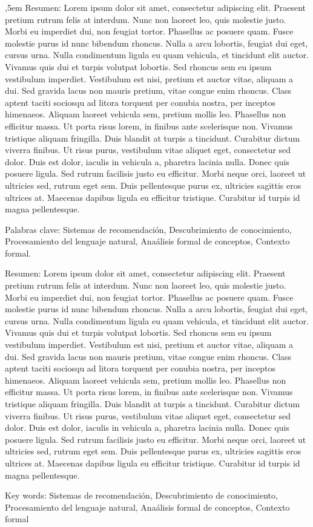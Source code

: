 \setcounter{page}{5}
{
,5em
Resumen: Lorem ipsum dolor sit amet, consectetur adipiscing elit. 
Praesent pretium rutrum felis at interdum. Nunc non laoreet leo, 
quis molestie justo. Morbi eu imperdiet dui, non feugiat tortor. 
Phasellus ac posuere quam. Fusce molestie purus id nunc bibendum 
rhoncus. Nulla a arcu lobortis, feugiat dui eget, cursus urna. 
Nulla condimentum ligula eu quam vehicula, et tincidunt elit 
auctor. Vivamus quis dui et turpis volutpat lobortis. Sed rhoncus 
sem eu ipsum vestibulum imperdiet. Vestibulum est nisi, pretium et 
auctor vitae, aliquam a dui. Sed gravida lacus non mauris pretium, 
vitae congue enim rhoncus. Class aptent taciti sociosqu ad litora 
torquent per conubia nostra, per inceptos himenaeos. Aliquam laoreet 
vehicula sem, pretium mollis leo. Phasellus non efficitur massa. 
Ut porta risus lorem, in finibus ante scelerisque non. Vivamus 
tristique aliquam fringilla. Duis blandit at turpis a tincidunt. 
Curabitur dictum viverra finibus. Ut risus purus, vestibulum vitae 
aliquet eget, consectetur sed dolor. Duis est dolor, iaculis in 
vehicula a, pharetra lacinia nulla. Donec quis posuere ligula. 
Sed rutrum facilisis justo eu efficitur. Morbi neque orci, laoreet 
ut ultricies sed, rutrum eget sem. Duis pellentesque purus ex, ultricies 
sagittis eros ultrices at. Maecenas dapibus ligula eu efficitur 
tristique. Curabitur id turpis id magna pellentesque. 

\doublespacing

Palabras clave: Sistemas de recomendaci\'on, Descubrimiento de conocimiento, 
Procesamiento del lenguaje natural, Ana\'alisis formal de conceptos, 
Contexto formal.

\doublespacing

Resumen: Lorem ipsum dolor sit amet, consectetur adipiscing elit. 
Praesent pretium rutrum felis at interdum. Nunc non laoreet leo, 
quis molestie justo. Morbi eu imperdiet dui, non feugiat tortor. 
Phasellus ac posuere quam. Fusce molestie purus id nunc bibendum 
rhoncus. Nulla a arcu lobortis, feugiat dui eget, cursus urna. 
Nulla condimentum ligula eu quam vehicula, et tincidunt elit 
auctor. Vivamus quis dui et turpis volutpat lobortis. Sed rhoncus 
sem eu ipsum vestibulum imperdiet. Vestibulum est nisi, pretium et 
auctor vitae, aliquam a dui. Sed gravida lacus non mauris pretium, 
vitae congue enim rhoncus. Class aptent taciti sociosqu ad litora 
torquent per conubia nostra, per inceptos himenaeos. Aliquam laoreet 
vehicula sem, pretium mollis leo. Phasellus non efficitur massa. 
Ut porta risus lorem, in finibus ante scelerisque non. Vivamus 
tristique aliquam fringilla. Duis blandit at turpis a tincidunt. 
Curabitur dictum viverra finibus. Ut risus purus, vestibulum vitae 
aliquet eget, consectetur sed dolor. Duis est dolor, iaculis in 
vehicula a, pharetra lacinia nulla. Donec quis posuere ligula. 
Sed rutrum facilisis justo eu efficitur. Morbi neque orci, laoreet 
ut ultricies sed, rutrum eget sem. Duis pellentesque purus ex, ultricies 
sagittis eros ultrices at. Maecenas dapibus ligula eu efficitur 
tristique. Curabitur id turpis id magna pellentesque.

\doublespacing

Key words: Sistemas de recomendaci\'on, Descubrimiento de conocimiento, 
Procesamiento del lenguaje natural, Ana\'alisis formal de conceptos, 
Contexto formal
}
\newpage
\thispagestyle{empty}
\mbox{}